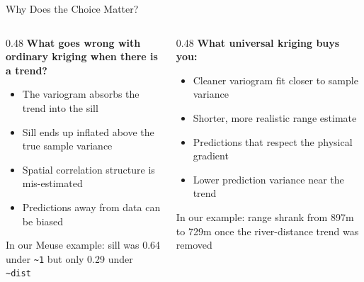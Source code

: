 \documentclass[aspectratio=169, 12pt]{beamer}
\begin{document}
\begin{frame}{Why Does the Choice Matter?}
  \begin{columns}[t]
    \begin{column}{0.48\textwidth}
      \textbf{What goes wrong with ordinary kriging when there is a trend?}
      \begin{itemize}
        \item The variogram absorbs the trend into the sill
        \item Sill ends up \alert{inflated} above the true sample variance
        \item Spatial correlation structure is mis-estimated
        \item Predictions away from data can be biased
      \end{itemize}
      \vspace{0.4em}
      \small In our Meuse example: sill was 0.64 under \texttt{\textasciitilde{}1} but only 0.29 under \texttt{\textasciitilde{}dist}
    \end{column}
    \begin{column}{0.48\textwidth}
      \textbf{What universal kriging buys you:}
      \begin{itemize}
        \item Cleaner variogram fit closer to sample variance
        \item Shorter, more realistic range estimate
        \item Predictions that respect the physical gradient
        \item Lower prediction variance near the trend
      \end{itemize}
      \vspace{0.4em}
      \small In our example: range shrank from 897m to 729m once the river-distance trend was removed
    \end{column}
  \end{columns}
\end{frame}
\end{document}
